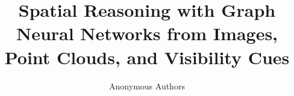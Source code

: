 \documentclass{article}
\title{Spatial Reasoning with Graph Neural Networks from Images, Point Clouds, and Visibility Cues}
\author{
  Anonymous Authors
}
\begin{document}
\maketitle

\begin{abstract}

\end{abstract}









\end{document}
